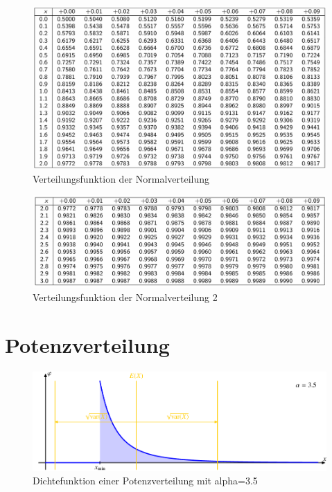 \documentclass[../Main.tex]{subfiles}
\begin{document}
\begin{figure}[H]
    \centering
    \includegraphics[width=1\linewidth]{Images/norm-tabelle.png}
    \caption{Verteilungsfunktion der Normalverteilung}
\end{figure}
\begin{figure}[H]
    \centering
    \includegraphics[width=1\linewidth]{Images/norm-tabelle-2.png}
    \caption{Verteilungsfunktion der Normalverteilung 2}
\end{figure}


\newpage
\section{Potenzverteilung}
\begin{figure}[H]
    \centering
    \includegraphics[width=1\linewidth]{Images/potenzverteilung.png}
    \caption{Dichtefunktion einer Potenzverteilung mit alpha=3.5}
\end{figure}
\end{document}
